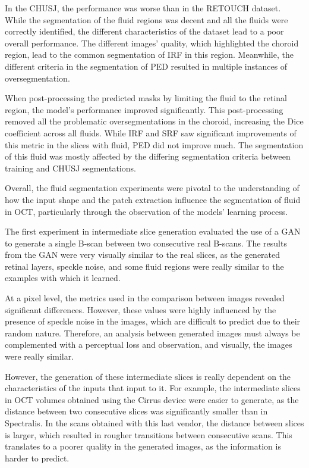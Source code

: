 \par
In the CHUSJ, the performance was worse than in the RETOUCH dataset. While the segmentation of the fluid regions was decent and all the fluids were correctly identified, the different characteristics of the dataset lead to a poor overall performance. The different images' quality, which highlighted the choroid region, lead to the common segmentation of IRF in this region. Meanwhile, the different criteria in the segmentation of PED resulted in multiple instances of oversegmentation.
\par
When post-processing the predicted masks by limiting the fluid to the retinal region, the model's performance improved significantly. This post-processing removed all the problematic oversegmentations in the choroid, increasing the Dice coefficient across all fluids. While IRF and SRF saw significant improvements of this metric in the slices with fluid, PED did not improve much. The segmentation of this fluid was mostly affected by the differing segmentation criteria between training and CHUSJ segmentations.
\par
Overall, the fluid segmentation experiments were pivotal to the understanding of how the input shape and the patch extraction influence the segmentation of fluid in OCT, particularly through the observation of the models' learning process. 
\par
The first experiment in intermediate slice generation evaluated the use of a GAN to generate a single B-scan between two consecutive real B-scans. The results from the GAN were very visually similar to the real slices, as the generated retinal layers, speckle noise, and some fluid regions were really similar to the examples with which it learned.
\par
At a pixel level, the metrics used in the comparison between images revealed significant differences. However, these values were highly influenced by the presence of speckle noise in the images, which are difficult to predict due to their random nature. Therefore, an analysis between generated images must always be complemented with a perceptual loss and observation, and visually, the images were really similar.
\par
However, the generation of these intermediate slices is really dependent on the characteristics of the inputs that input to it. For example, the intermediate slices in OCT volumes obtained using the Cirrus device were easier to generate, as the distance between two consecutive slices was significantly smaller than in Spectralis. In the scans obtained with this last vendor, the distance between slices is larger, which resulted in rougher transitions between consecutive scans. This translates to a poorer quality in the generated images, as the information is harder to predict.
